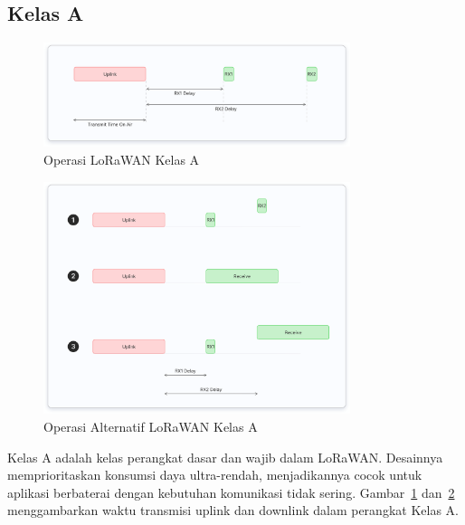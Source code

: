 \subsection{Kelas A}
\begin{figure}[htbp]
    \centering
    \includegraphics[width=0.8\textwidth]{figures/class-a.png}
    \caption{Operasi LoRaWAN Kelas A}
    \label{fig:lora_class_a}
\end{figure}
\begin{figure}
    \centering
    \includegraphics[width=0.8\textwidth]{figures/class-a-alt.png}
    \caption{Operasi Alternatif LoRaWAN Kelas A}
    \label{fig:lora_class_a_alt}
\end{figure}
Kelas A adalah kelas perangkat dasar dan wajib dalam LoRaWAN. Desainnya memprioritaskan konsumsi daya ultra-rendah, menjadikannya cocok untuk aplikasi berbaterai dengan kebutuhan komunikasi tidak sering.
Gambar~\ref{fig:lora_class_a} dan~\ref{fig:lora_class_a_alt} menggambarkan waktu transmisi uplink dan downlink dalam perangkat Kelas A.
